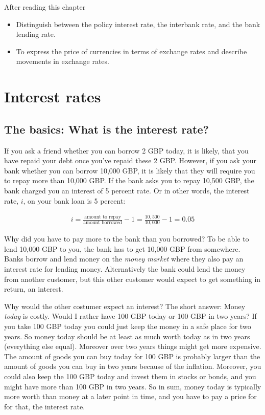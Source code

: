 \documentclass[]{book}
\providecommand{\tightlist}{%
  \setlength{\itemsep}{0pt}\setlength{\parskip}{0pt}}
\begin{document}
After reading this chapter

\begin{itemize}
\tightlist
\item
  Distinguish between the policy interest rate, the interbank rate, and the bank lending rate.
\item
  To express the price of currencies in terms of exchange rates and describe movements in exchange rates.
\end{itemize}

\hypertarget{interest-rates}{%
\section{Interest rates}\label{interest-rates}}

\hypertarget{the-basics-what-is-the-interest-rate}{%
\subsection{The basics: What is the interest rate?}\label{the-basics-what-is-the-interest-rate}}

If you ask a friend whether you can borrow 2 GBP today, it is likely, that you have repaid your debt once you've repaid these 2 GBP. However, if you ask your bank whether you can borrow 10,000 GBP, it is likely that they will require you to repay more than 10,000 GBP. If the bank asks you to repay 10,500 GBP, the bank charged you an interest of 5 percent rate. Or in other words, the interest rate, \(i\), on your bank loan is 5 percent:

\begin{align}
    i=\frac{\text{amount to repay}}{\text{amount borrowed}}-1=\frac{10,500}{10,000}-1=0.05
\end{align}

Why did you have to pay more to the bank than you borrowed? To be able to lend 10,000 GBP to you, the bank has to get 10,000 GBP from somewhere. Banks borrow and lend money on the \emph{money market} where they also pay an interest rate for lending money. Alternatively the bank could lend the money from another customer, but this other customer would expect to get something in return, an interest.

Why would the other costumer expect an interest? The short answer: Money \emph{today} is costly. Would I rather have 100 GBP today or 100 GBP in two years? If you take 100 GBP today you could just keep the money in a safe place for two years. So money today should be at least as much worth today as in two years (everything else equal). Moreover over two years things might get more expensive. The amount of goods you can buy today for 100 GBP is probably larger than the amount of goods you can buy in two years because of the inflation. Moreover, you could also keep the 100 GBP today and invest them in stocks or bonds, and you might have more than 100 GBP in two years. So in sum, money today is typically more worth than money at a later point in time, and you have to pay a price for for that, the interest rate.
\end{document}

